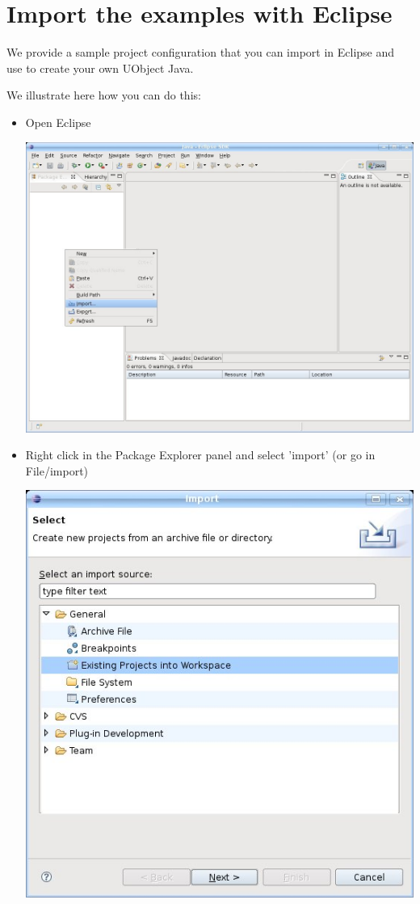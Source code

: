 \section{Import the examples with Eclipse}
\label{sec:uob:apijava:import}

We provide a sample  project configuration that
you can import in Eclipse and use to create your own UObject Java.

We illustrate here how you can do this:

\begin{itemize}
\item Open Eclipse

\begin{center}
  \includegraphics[width=0.6\linewidth]{img/eclipse-import}
\end{center}

\item Right click in the Package Explorer panel and select 'import' (or go in File/import)

\begin{center}
  \includegraphics[width=0.6\linewidth]{img/select-import}
\end{center}


\end{itemize}

